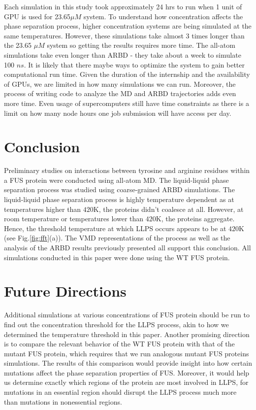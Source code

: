 \documentclass[12ptr]{article}
\begin{document}
Each simulation in this study took approximately 24 hrs to run when 1 unit of GPU is used for 23.65$\mu M$ system. To understand how concentration affects the phase separation process, higher concentration systems are being simulated at the same temperatures. However, these simulations take almost 3 times longer than the 23.65 $\mu M$ system so getting the results requires more time. The all-atom simulations take even longer than ARBD - they take about a week to simulate 100 $ns$. It is likely that there maybe ways to optimize the system to gain better computational run time. Given the duration of the internship and the availability of GPUs, we are limited in how many simulations we can run. Moreover, the process of writing code to analyze the MD and ARBD trajectories adds even more time. Even usage of supercomputers still have time constraints as there is a limit on how many node hours one job submission will have access per day. \\[0.01cm]
  
\newpage
\section{Conclusion}
Preliminary studies on interactions between tyrosine and arginine residues within a FUS protein were conducted using all-atom MD. The liquid-liquid phase separation process was studied using coarse-grained ARBD simulations. The liquid-liquid phase separation process is highly temperature dependent as at temperatures higher than $420$K, the proteins didn't coalesce at all. However, at room temperature or temperatures lower than $420$K, the proteins aggregate. Hence, the threshold temperature at which LLPS occurs appears to be at $420$K (see Fig.\ref{fig:fft}(a)). The VMD representations of the process as well as the analysis of the ARBD results previously presented all support this conclusion. All simulations conducted in this paper were done using the WT FUS protein. 

\section{Future Directions}
Additional simulations at various concentrations of FUS protein should be run to find out the concentration threshold for the LLPS process, akin to how we determined the temperature threshold in this paper. Another promising direction is to compare the relevant behavior of the WT FUS protein with that of the mutant FUS protein, which requires that we run analogous mutant FUS proteins simulations. The results of this comparison would provide insight into how certain mutations affect the phase separation properties of FUS. Moreover, it would help us determine exactly which regions of the protein are most involved in LLPS, for mutations in an essential region should disrupt the LLPS process much more than mutations in nonessential regions. 
\end{document}
